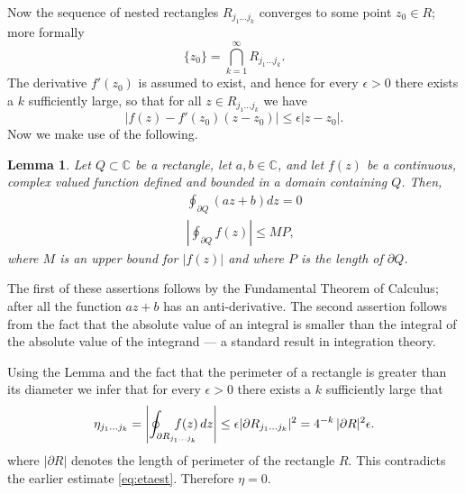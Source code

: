 \documentclass[12pt]{article}
\newcommand{\cnums}{\mathbb{C}}
\newtheorem{lemma}[proposition]{Lemma}
\begin{document}
Now the sequence of nested rectangles $R_{j_1 \ldots j_k}$
converges to some point $z_0\in R$; more formally
$$\{z_0\} = \bigcap_{k=1}^\infty R_{j_1\ldots j_k}.$$
The derivative
$f'(z_0)$ is assumed to exist, and hence for every $\epsilon>0$ there
exists a $k$ sufficiently large, so that for all $z\in R_{j_1\ldots j_k}$
we have
$$\vert f(z)-f'(z_0)(z-z_0) \vert \leq \epsilon \vert z-z_0\vert.$$
Now we make use of the following.
\begin{lemma}
  Let $Q\subset\cnums$ be a rectangle, let $a,b\in\cnums$, and let
  $f(z)$ be a continuous, complex valued function defined and bounded
  in a domain containing $Q$.  Then,
  \begin{eqnarray*}
    &&\oint_{\partial Q} (az+b) dz = 0 \\
    &&\left\vert \oint_{\partial Q} \!\!\!f(z) \right \vert \leq MP,
  \end{eqnarray*}
  where $M$ is an upper bound for $|f(z)|$ and where $P$ is the length
  of $\partial Q$.
\end{lemma}
The first of these assertions follows by the Fundamental Theorem of
Calculus; after all the function $az+b$ has an anti-derivative.  The
second assertion follows from the fact that the absolute value of an
integral is smaller than the integral of the absolute value of the
integrand --- a standard result in integration theory.

Using the Lemma and the fact that the perimeter of a rectangle is
greater than its diameter we infer that for every $\epsilon>0$ there
exists a $k$ sufficiently large that 
$$\eta_{j_1\ldots j_k} = \left\vert \oint_{\partial R_{j_1\ldots
      j_k}}\hskip -2em f(z)\, dz \right\vert \leq \epsilon
\vert\partial R_{j_1\ldots j_k}\vert^2 =  4^{-k}\, \vert
\partial R\vert^2 \epsilon.$$
where $\vert\partial R\vert$ denotes the
length of perimeter of the rectangle $R$.  This contradicts the
earlier estimate \eqref{eq:etaest}.  Therefore 
$\eta=0$.
\end{document}
